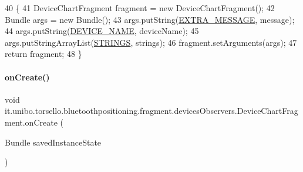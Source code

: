 \begin{DoxyCode}
40                                                                              \{
41         DeviceChartFragment fragment = \textcolor{keyword}{new} DeviceChartFragment();
42         Bundle args = \textcolor{keyword}{new} Bundle();
43         args.putString(\hyperlink{classit_1_1unibo_1_1torsello_1_1bluetoothpositioning_1_1fragment_1_1devicesObservers_1_1DeviceChartFragment_a07b2f252088c2cf0af46ea39ae83bc09_a07b2f252088c2cf0af46ea39ae83bc09}{EXTRA\_MESSAGE}, message);
44         args.putString(\hyperlink{classit_1_1unibo_1_1torsello_1_1bluetoothpositioning_1_1fragment_1_1devicesObservers_1_1DeviceChartFragment_a5f778eb494a70b25d52ea96e85342011_a5f778eb494a70b25d52ea96e85342011}{DEVICE\_NAME}, deviceName);
45         args.putStringArrayList(\hyperlink{classit_1_1unibo_1_1torsello_1_1bluetoothpositioning_1_1fragment_1_1devicesObservers_1_1DeviceChartFragment_a343835bbfb305e22881397c1b9249b00_a343835bbfb305e22881397c1b9249b00}{STRINGS}, strings);
46         fragment.setArguments(args);
47         \textcolor{keywordflow}{return} fragment;
48     \}
\end{DoxyCode}
\hypertarget{classit_1_1unibo_1_1torsello_1_1bluetoothpositioning_1_1fragment_1_1devicesObservers_1_1DeviceChartFragment_a2941a5d389e0ab2c21cb96a61ba72dca_a2941a5d389e0ab2c21cb96a61ba72dca}{}\label{classit_1_1unibo_1_1torsello_1_1bluetoothpositioning_1_1fragment_1_1devicesObservers_1_1DeviceChartFragment_a2941a5d389e0ab2c21cb96a61ba72dca_a2941a5d389e0ab2c21cb96a61ba72dca} 
\paragraph{\texorpdfstring{on\+Create()}{onCreate()}}
{\footnotesize\ttfamily void it.\+unibo.\+torsello.\+bluetoothpositioning.\+fragment.\+devices\+Observers.\+Device\+Chart\+Fragment.\+on\+Create (\begin{DoxyParamCaption}\item[{Bundle}]{saved\+Instance\+State }\end{DoxyParamCaption})}


